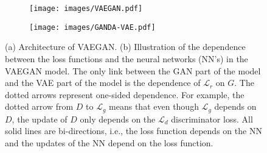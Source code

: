 \documentclass{article}
\begin{document}


\begin{figure}
     \centering
     \begin{subfigure}[b]{0.55\textwidth}
         \centering
         \texttt{[image: images/VAEGAN.pdf]}
         \caption{}
         \label{illu}
     \end{subfigure}
     \hfill
     \begin{subfigure}[b]{0.38\textwidth}
         \centering
         \texttt{[image: images/GANDA-VAE.pdf]}
         \caption{}
         \label{GANDA-VAE}
     \end{subfigure}

        \caption{ (a) Architecture of VAEGAN. (b) Illustration of the dependence between the loss functions and the neural networks (NN's) in the VAEGAN model. The only link between the GAN part of the model and the VAE part of the model is the dependence of $\mathcal{L}_r$ on $G$. The dotted arrows %
        represent one-sided dependence. For example, the dotted arrow %
        from $D$ to $\mathcal{L}_g$ means that even though $\mathcal{L}_g$ depends on $D$, the update of $D$ only depends on the $\mathcal{L}_d$ discriminator loss. All solid lines are bi-directions, i.e., the loss function depends on the NN and the updates of the NN depend on the loss function.}
        \label{fig:VAEGAN}
        \vspace{-1ex}
\end{figure}

\end{document}
